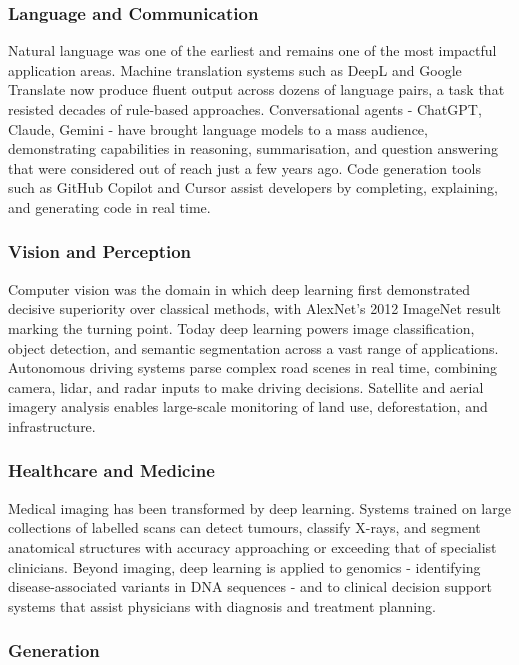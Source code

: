 \subsubsection{Language and Communication}

Natural language was one of the earliest and remains one of the most impactful application areas. Machine translation systems such as DeepL and Google Translate now produce fluent output across dozens of language pairs, a task that resisted decades of rule-based approaches. Conversational agents - ChatGPT, Claude, Gemini - have brought language models to a mass audience, demonstrating capabilities in reasoning, summarisation, and question answering that were considered out of reach just a few years ago. Code generation tools such as GitHub Copilot and Cursor assist developers by completing, explaining, and generating code in real time.

\subsubsection{Vision and Perception}

Computer vision was the domain in which deep learning first demonstrated decisive superiority over classical methods, with AlexNet's 2012 ImageNet result marking the turning point. Today deep learning powers image classification, object detection, and semantic segmentation across a vast range of applications. Autonomous driving systems parse complex road scenes in real time, combining camera, lidar, and radar inputs to make driving decisions. Satellite and aerial imagery analysis enables large-scale monitoring of land use, deforestation, and infrastructure.

\subsubsection{Healthcare and Medicine}

Medical imaging has been transformed by deep learning. Systems trained on large collections of labelled scans can detect tumours, classify X-rays, and segment anatomical structures with accuracy approaching or exceeding that of specialist clinicians. Beyond imaging, deep learning is applied to genomics - identifying disease-associated variants in DNA sequences - and to clinical decision support systems that assist physicians with diagnosis and treatment planning.

\subsubsection{Generation}

